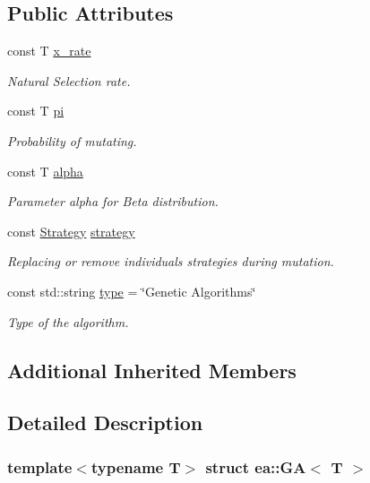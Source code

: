 \subsection*{Public Attributes}
\begin{DoxyCompactItemize}
\item 
const T \hyperlink{structea_1_1_g_a_ab72149b9ca39f385432e5310f4ae5ed6}{x\+\_\+rate}
\begin{DoxyCompactList}\small\item\em Natural Selection rate. \end{DoxyCompactList}\item 
const T \hyperlink{structea_1_1_g_a_a1efaa83a84ddebf8825308cdf2b7b2ce}{pi}
\begin{DoxyCompactList}\small\item\em Probability of mutating. \end{DoxyCompactList}\item 
const T \hyperlink{structea_1_1_g_a_a620f9573d21cc8eb9f49bfd8dc5086cc}{alpha}
\begin{DoxyCompactList}\small\item\em Parameter alpha for Beta distribution. \end{DoxyCompactList}\item 
const \hyperlink{namespaceea_a8e369877773b4db67b8512efdb4f8f89}{Strategy} \hyperlink{structea_1_1_g_a_a0bb275a7550304c1ae4c19db06ed8969}{strategy}
\begin{DoxyCompactList}\small\item\em Replacing or remove individuals strategies during mutation. \end{DoxyCompactList}\item 
const std\+::string \hyperlink{structea_1_1_g_a_a513eb50f77399d52e1aebf7d200b44c8}{type} = \char`\"{}Genetic Algorithms\char`\"{}
\begin{DoxyCompactList}\small\item\em Type of the algorithm. \end{DoxyCompactList}\end{DoxyCompactItemize}
\subsection*{Additional Inherited Members}


\subsection{Detailed Description}
\subsubsection*{template$<$typename T$>$\newline
struct ea\+::\+G\+A$<$ T $>$}

